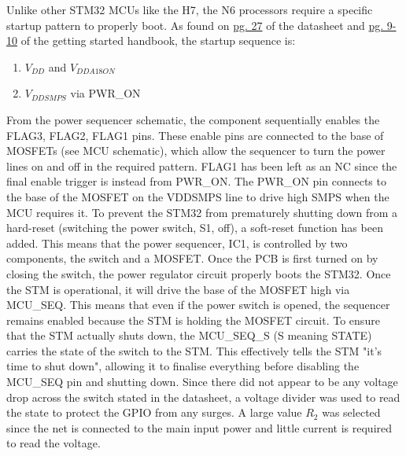 Unlike other STM32 MCUs like the H7, the N6 processors require a specific startup pattern to properly boot.
As found on \href{https://www.st.com/resource/en/datasheet/stm32n657a0.pdf}{pg. 27} of the datasheet and \href{https://www.st.com/resource/en/application_note/an5967-getting-started-with-hardware-development-for-stm32n6-mcus-stmicroelectronics.pdf}{pg. 9-10} of the getting started handbook, the startup sequence is:
\begin{enumerate}
    \item $V_{DD}$ and $V_{DDA18ON}$
    \item $V_{DDSMPS}$ via PWR\_ON
\end{enumerate}
From the power sequencer schematic, the component sequentially enables the FLAG3, FLAG2, FLAG1 pins.
These enable pins are connected to the base of MOSFETs (see MCU schematic), which allow the sequencer to turn the power lines on and off in the required pattern. 
FLAG1 has been left as an NC since the final enable trigger is instead from PWR\_ON. The PWR\_ON pin connects to the base of the MOSFET on the VDDSMPS line to drive high SMPS when the MCU requires it.
\nl
To prevent the STM32 from prematurely shutting down from a hard-reset (switching the power switch, S1, off), a soft-reset function has been added. This means that the power sequencer, IC1, is controlled by two components, the switch and a MOSFET.
Once the PCB is first turned on by closing the switch, the power regulator circuit properly boots the STM32. Once the STM is operational, it will drive the base of the MOSFET high via MCU\_SEQ.
This means that even if the power switch is opened, the sequencer remains enabled because the STM is holding the MOSFET circuit. To ensure that the STM actually shuts down, the MCU\_SEQ\_S (S meaning STATE) carries the state of the switch to the STM.
This effectively tells the STM "it's time to shut down", allowing it to finalise everything before disabling the MCU\_SEQ pin and shutting down.
\nl
Since there did not appear to be any voltage drop across the switch stated in the datasheet, a voltage divider was used to read the state to protect the GPIO from any surges. A large value $R_2$ was selected since the net is connected to the main input power and little current is required to read the voltage.
